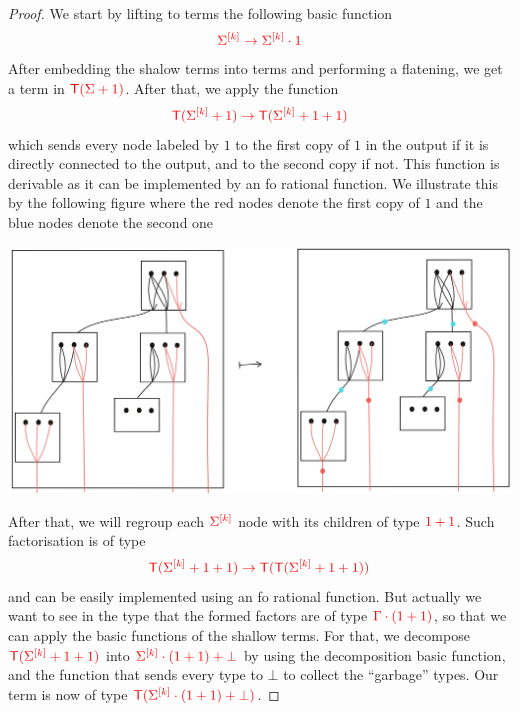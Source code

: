 \begin{proof}
We start by lifting to terms the following basic function 
\begin{align*}
{\color{red}{\Sigma^{{\color{red}{[k]}}}  \to \Sigma^{{\color{red}{[k]}}} \cdot1}}
\end{align*}
After embedding the shalow terms into terms and performing a flatening, we get a term in ${\color{red}{{\color{red}{\mathsf T}}(\Sigma+1)}}$. After that, we apply the function
\begin{align*}
{\color{red}{{\color{red}{\mathsf T}}(\Sigma^{{\color{red}{[k]}}}+1)\to {\color{red}{\mathsf T}}(\Sigma^{{\color{red}{[k]}}}+1+1)}}
\end{align*}
which sends every node labeled by $1$ to the first copy of $1$ in the output if it is directly connected to the output, and to the second copy if not. This function is derivable as it can be implemented by an fo rational function. We illustrate this by the following figure where the red nodes denote the first copy of $1$ and the blue nodes denote the second one
\begin{center}
\includegraphics[scale=.1]{MyPicLabel1.jpg}
\end{center}  
After that, we will regroup each ${\color{red}{\Sigma^{{\color{red}{[k]}}}}}$ node with its children of type ${\color{red}{1+1}}$. Such factorisation is of type
\begin{align*}
{\color{red}{{\color{red}{\mathsf T}}(\Sigma^{{\color{red}{[k]}}}+1+1)\to {\color{red}{\mathsf T}}({\color{red}{\mathsf T}}(\Sigma^{{\color{red}{[k]}}}+1+1))}}
\end{align*} 
and can be easily implemented using an fo rational function.
But actually we want to see in the type that the formed factors are of type ${\color{red}{\Gamma\cdot(1+1)}}$, so that we can apply the basic functions of the shallow terms. For that, we decompose ${\color{red}{{\color{red}{\mathsf T}}(\Sigma^{{\color{red}{[k]}}}+1+1)}}$ into ${\color{red}{\Sigma^{{\color{red}{[k]}}}\cdot(1+1)+\bot}}$ by using the decomposition basic function, and the function 
that sends every type to $\bot$ to collect the ``garbage'' types.
Our term is now of type ${\color{red}{{\color{red}{\mathsf T}}(\Sigma^{{\color{red}{[k]}}}\cdot(1+1)+\bot)}}$.

\end{proof}
